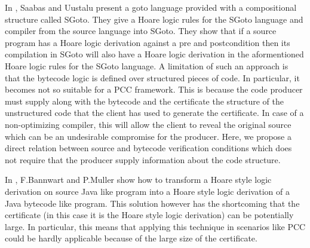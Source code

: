 In \cite{SU05CNS}, Saabas and Uustalu present a goto language provided with a compositional structure called SGoto.
They give a Hoare logic rules for the SGoto language and compiler from the source language into SGoto.
They show that if a source program has a Hoare logic derivation
 against a pre and postcondition then its compilation in SGoto will also have a Hoare
 logic derivation in the aformentioned Hoare logic rules for the SGoto language. 
A limitation of such an approach is that the bytecode logic is defined over structured pieces of code. In particular,
it becomes not so suitable for  a  PCC framework. This is because the code producer must supply along with the 
bytecode and the certificate the structure of the unstructured code that the client has used to
 generate the certificate. In case of a non-optimizing compiler, this will allow the client to reveal the original source 
which can be an undesirable compromise for the producer. 
Here, we propose a direct relation between source and bytecode verification conditions which does not require that the producer
supply information about the code structure. 

 


 In \cite{FB04LBT}, F.Bannwart and P.Muller show how to transform a Hoare style logic derivation on source Java like
 program into a Hoare style logic derivation of a Java bytecode like program. This solution however has the shortcoming
that the certificate (in this case it is the Hoare style logic derivation) can be potentially large. In particular, this means that
applying this technique in scenarios like PCC could be hardly applicable because of the large size of the certificate. 
    


